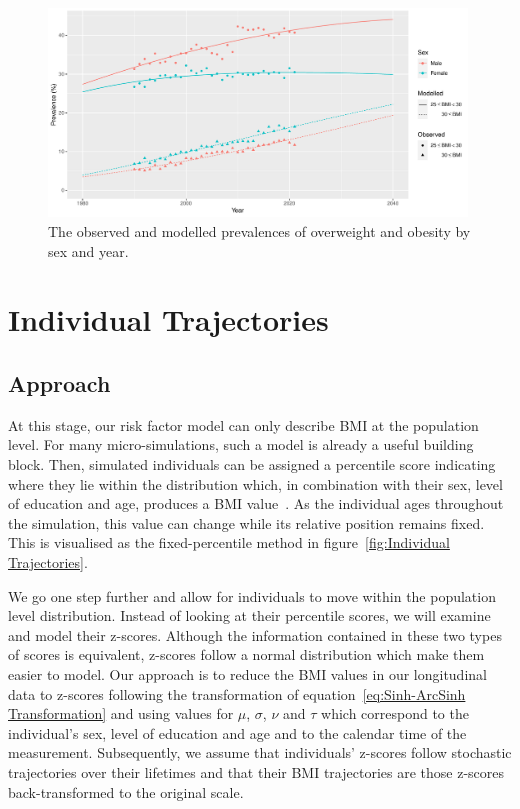 \documentclass{imammb}
\numberwithin{equation}{section}
\begin{document}
\begin{figure}[!h]
\centering
\includegraphics[width=0.99\textwidth] {"Figures/Historical Trend.pdf"}
\caption{The observed and modelled prevalences of overweight and obesity by sex and year.}
\label{fig:Historical Trend}
\vspace*{-9pt}
\end{figure}

\section{Individual Trajectories}
\label{sec:Individual Trajectories}

\subsection{Approach}
\label{sec:Individual Trajectories/Approach}

At this stage, our risk factor model can only describe BMI at the population level. For many micro-simulations, such a model is already a useful building block. Then, simulated individuals can be assigned a percentile score indicating where they lie within the distribution which, in combination with their sex, level of education and age, produces a BMI value~\citep{McPherson2007, OECD2019}. As the individual ages throughout the simulation, this value can change while its relative position remains fixed. This is visualised as the fixed-percentile method in figure~\ref{fig:Individual Trajectories}.

We go one step further and allow for individuals to move within the population level distribution. Instead of looking at their percentile scores, we will examine and model their z-scores. Although the information contained in these two types of scores is equivalent, z-scores follow a normal distribution which make them easier to model. Our approach is to reduce the BMI values in our longitudinal data to z-scores following the transformation of equation~\ref{eq:Sinh-ArcSinh Transformation} and using values for $\mu$, $\sigma$, $\nu$ and $\tau$ which correspond to the individual's sex, level of education and age and to the calendar time of the measurement. Subsequently, we assume that individuals' z-scores follow stochastic trajectories over their lifetimes and that their BMI trajectories are those z-scores back-transformed to the original scale.
\end{document}
